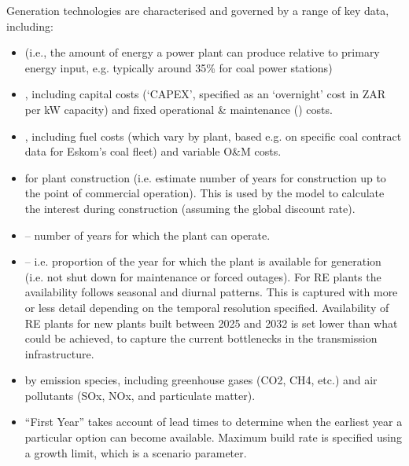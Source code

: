 \documentclass[letterpaper,10pt,english]{jupyterBook}
\begin{document}
\sphinxAtStartPar
Generation technologies are characterised and governed by a range of key data, including:
\begin{itemize}
\item {} 
\sphinxAtStartPar
{} (i.e., the amount of energy a power plant can produce relative to primary energy input, e.g. typically around 35\% for coal power stations)

\item {} 
\sphinxAtStartPar
{}, including capital costs (‘CAPEX’, specified as an ‘overnight’ cost in ZAR per kW capacity) and fixed operational \& maintenance () costs.

\item {} 
\sphinxAtStartPar
{}, including fuel costs (which vary by plant, based e.g. on specific coal contract data for Eskom’s coal fleet) and variable O\&M costs.

\item {} 
\sphinxAtStartPar
{} for plant construction (i.e. estimate number of years for construction up to the point of commercial operation). This is used by the model to calculate the interest during construction (assuming the global discount rate).

\item {} 
\sphinxAtStartPar
{} – number of years for which the plant can operate.

\item {} 
\sphinxAtStartPar
{} – i.e. proportion of the year for which the plant is available for generation (i.e. not shut down for maintenance or forced outages). For RE plants the availability follows seasonal and diurnal patterns. This is captured with more or less detail depending on the temporal resolution specified. Availability of RE plants for new plants built between 2025 and 2032 is set lower than what could be achieved, to capture the current bottlenecks in the transmission infrastructure.

\item {} 
\sphinxAtStartPar
{} by emission species, including greenhouse gases (CO2, CH4, etc.) and air pollutants (SOx, NOx, and particulate matter).

\item {} 
\sphinxAtStartPar
{} “First Year” takes account of lead times to determine when the earliest year a particular option can become available. Maximum build rate is specified using a growth limit, which is a scenario parameter.

\end{itemize}
\end{document}
